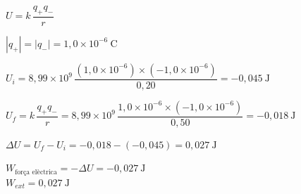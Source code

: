 \begin{solapartat}
 $U = k\,\dfrac{q_+ q_-}{r}$

$|q_+| = |q_-| = 1,0\times 10^{-6}\ \mathrm{C}$

 $U_i = 8,99\times 10^{9}\,\dfrac{(1,0\times 10^{-6})\times(-1,0\times 10^{-6})}{0,20} = -0,045\ \mathrm{J}$
\end{solapartat}

\begin{solapartat}
 $U_f = k\,\dfrac{q_+ q_-}{r} = 8,99\times 10^{9}\,\dfrac{1,0\times 10^{-6}\times(-1,0\times 10^{-6})}{0,50} = -0,018\ \mathrm{J}$

 $\Delta U = U_f - U_i = -0,018 - (-0,045) = 0,027\ \mathrm{J}$

 $W_\text{força elèctrica} = -\Delta U = -0,027\ \mathrm{J}$\\
$W_\mathit{ext} = 0,027\ \mathrm{J}$
\end{solapartat}
